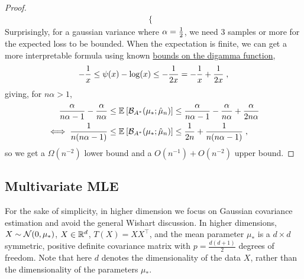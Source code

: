 \documentclass[twoside]{article}
\newcommand*{\expect}[2][]{\ensuremath{\mathbb{E}_{#1} \left[ #2 \right] }} %
\newcommand{\logpart}{A}
\newcommand{\bregmanconj}{\cB_{\logpart^*}}
\begin{document}
\begin{proof}
\begin{align}
\begin{cases}
	\end{cases}
	\end{align}
	Surprisingly, for a gaussian variance where $\alpha = \frac{1}{2}$, we need $3$ samples or more for the expected loss to be bounded.
	When the expectation is finite, we can get a more interpretable formula using known \href{https://en.wikipedia.org/wiki/Digamma_function#Inequalities}{bounds on the digamma function},
	\begin{align}
		-\frac{1}{x} \leq \psi(x) - \log(x) \leq -\frac{1}{2x} = - \frac{1}{x} + \frac{1}{2x}	\; ,
	\end{align}
	giving, for $n \alpha >1 $,
	\begin{align}
		\frac{\alpha}{n\alpha-1} - \frac{\alpha}{n\alpha}
		&\leq \expect{\bregmanconj( \mu_*; \hat \mu_n) }
		\leq \frac{\alpha}{n\alpha-1} - \frac{\alpha}{n\alpha} + \frac{\alpha}{2n\alpha}
		\\
		\iff
			\frac{1}{n(n \alpha-1)}
			&\leq \expect{\bregmanconj( \mu_*; \hat \mu_n) }
			\leq \inv{2n} + \frac{1}{n(n \alpha-1)} \; ,
	\end{align}
	so we get a $\Omega(n^{-2})$ lower bound and a $O(n^{-1}) + O(n^{-2})$ upper bound.
	\end{proof}


\subsection{Multivariate MLE}
\label{app:multivariateMLE}

For the sake of simplicity, in higher dimension we focus on Gaussian covariance estimation and avoid the general Wishart discussion. 
In higher dimensions, $X \sim {\mathcal N}(0, \mu_*)$, $X\in\mathbb{R}^d$, $T(X) = XX^\top$, and the mean parameter $\mu_*$ 
is a $d \times d$ symmetric, positive definite covariance matrix with $p = \frac{d(d+1)}{2}$ degrees of freedom.
Note that here $d$ denotes the dimensionality of the data $X$, rather than the dimensionality of the parameters $\mu_*$.
\end{document}

